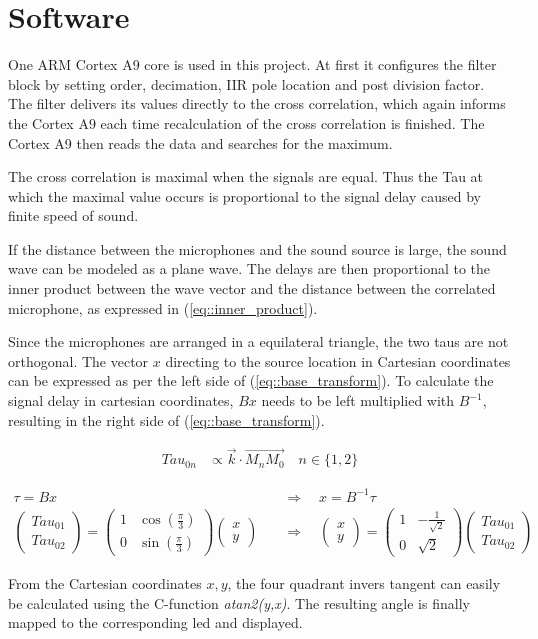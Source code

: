 \section{Software}
\label{sec::software}

One ARM Cortex A9 core is used in this project.
At first it configures the filter block by setting order, decimation, IIR pole location and post division factor.
The filter delivers its values directly to the cross correlation, which again informs the Cortex A9 each time recalculation of the cross correlation is finished.
The Cortex A9 then reads the data and searches for the maximum.

The cross correlation is maximal when the signals are equal.
Thus the Tau at which the maximal value occurs is proportional to the signal delay caused by finite speed of sound.

If the distance between the microphones and the sound source is large, the sound wave can be modeled as a plane wave.
The delays are then proportional to the inner product between the wave vector and the  distance between the correlated microphone, as expressed in (\ref{eq::inner_product}).

Since the microphones are arranged in a equilateral triangle, the two taus are not orthogonal.
The vector $x$ directing to the source location in Cartesian coordinates can be expressed as per the left side of (\ref{eq::base_transform}).
To calculate the signal delay in cartesian coordinates, $Bx$ needs to be left multiplied with $B^{-1}$, resulting in the right side of  (\ref{eq::base_transform}).

\begin{align}
	{Tau}_{0n} &\propto \overrightarrow{k} \cdot \overrightarrow{M_nM_0} \quad n\in\{1,2\}\label{eq::inner_product}
\end{align}

\begin{align}
	\tau = Bx \quad &\Rightarrow \quad x = B^{-1}\tau \label{eq::base_transform}\\
	\begin{pmatrix} {Tau}_{01} \\ {Tau}_{02}\end{pmatrix}
		=  \begin{pmatrix} 1 & \cos(\frac{\pi}{3}) \\ 0 & \sin(\frac{\pi}{3})\end{pmatrix} \begin{pmatrix} x \\ y\end{pmatrix}
	\quad &\Rightarrow \quad \begin{pmatrix} x \\ y \end{pmatrix}	= \begin{pmatrix} 1 & -\frac{1}{\sqrt{2}} \\ 0 & \sqrt{2}\end{pmatrix} \begin{pmatrix} {Tau}_{01} \\ {Tau}_{02}\end{pmatrix}
\end{align}

From the Cartesian coordinates $x,y$, the four quadrant invers tangent can easily be calculated using the C-function \emph{atan2(y,x)}.
The resulting angle is finally mapped to the corresponding led and displayed.